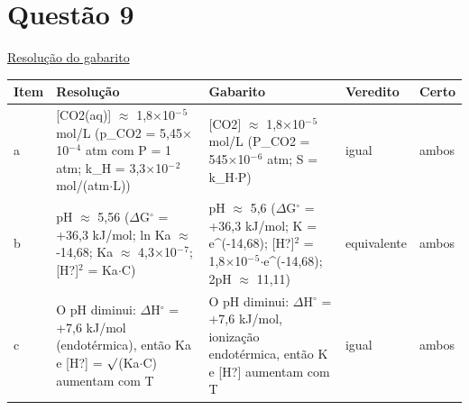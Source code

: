 \documentclass{article}%
\begin{document}
\section*{Questão 9}%
\href{https://poliedroresolve.sistemapoliedro.com.br/vestibulares/ime/2026/ime-2-fase-dia-3-25-10-2025-2-fase-dia-3/dissertativa-9-quimica-2-fase-dia-3-ime-2026}{Resolução do gabarito}\par\smallskip%
\begin{longtable}{@{}p{} p{} p{} p{} p{}@{}}\toprule Item & Resolução & Gabarito & Veredito & Certo \\ \midrule
a & {[}CO2(aq){]} $\approx$ 1,8$\times$10$^{-}$$^{5}$ mol/L (p\_CO2 = 5,45$\times$10$^{-}$$^{4}$ atm com P = 1 atm; k\_H = 3,3$\times$10$^{-}$$^2$ mol/(atm$\cdot$L)) & {[}CO2{]} $\approx$ 1,8$\times$10$^{-}$$^{5}$ mol/L (P\_CO2 = 545$\times$10$^{-}$$^{6}$ atm; S = k\_H$\cdot$P) & igual & ambos \\
b & pH $\approx$ 5,56 ($\Delta$G$^\circ$ = +36,3 kJ/mol; ln Ka $\approx$ -14,68; Ka $\approx$ 4,3$\times$10$^{-}$$^{7}$; {[}H?{]}$^2$ = Ka$\cdot$C) & pH $\approx$ 5,6 ($\Delta$G$^\circ$ = +36,3 kJ/mol; K = e\^{}(-14,68); {[}H?{]}$^2$ = 1,8$\times$10$^{-}$$^{5}$$\cdot$e\^{}(-14,68); 2pH $\approx$ 11,11) & equivalente & ambos \\
c & O pH diminui: $\Delta$H$^\circ$ = +7,6 kJ/mol (endotérmica), então Ka e {[}H?{]} = $\surd$(Ka$\cdot$C) aumentam com T & O pH diminui: $\Delta$H$^\circ$ = +7,6 kJ/mol, ionização endotérmica, então K e {[}H?{]} aumentam com T & igual & ambos \\
\bottomrule\end{longtable}%
\end{document}
